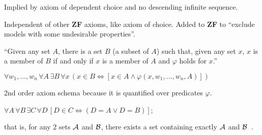 Implied by axiom of dependent choice and 
no descending infinite sequence.

Independent of other \textbf{ZF} axioms, like axiom of choice.
Added to \textbf{ZF} to 
``exclude models with some undesirable properties''.


``Given any set $A$, there is a set $B$ (a subset of $A$) 
such that, given any set $x$, 
$x$ is a member of $B$ if and only if $x$ is a member of $A$ 
and $\varphi$ holds for $x$.''
\cite{wiki:Axiom_schema_of_specification}

${\displaystyle 
\forall w_{1},\ldots ,w_{n}\,
\forall A\,\exists B\,
\forall x\,
(x\in B
\Leftrightarrow
[x\in A\land \varphi (x,w_{1},\ldots ,w_{n},A)])}$
 
2nd order axiom schema because it is quantified over predicates
 $\varphi$.
 
\label{sec:Axiom-of-pairing}

$\forall A\,\forall B\,\exists C\,\forall D\,
[D\in C\iff (D=A\lor D=B)]$;

that is, for any $2$ sets $\mathcal{A}$ and $\mathcal{B}$,
there exists a set containing exactly $\mathcal{A}$ and 
$\mathcal{B}$~\cite{wiki:Axiom_of_pairing}.

\label{sec:Axiom-of-union}





\setcounter{currentlevel}{\value{baseSectionLevel}}


\setcounter{currentlevel}{\value{baseSectionLevel}}

